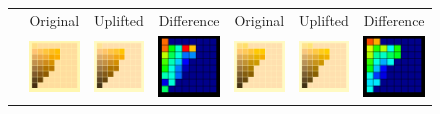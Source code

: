 \begin{figure}[t!]
	\centering
	{\sffamily
		\setlength\tabcolsep{0.5pt}
		\begin{tabular}{ccccccc}
			&Original& Uplifted & Difference &\quad Original & Uplifted & Difference
			\vspace{1em} \\ 
			\raisebox{0.4cm}[0pt][0pt]{\parbox[c][0pt][c]{0cm}{\hspace{-1.5em}\\[20pt]}\par}
			&\includegraphics[width=.155\linewidth]{img/results_uplift_page09_originalFL11.png}
			&
			\includegraphics[width=.155\linewidth]{img/results_uplift_page09_sigmoidFL11.png}
			& 
			\includegraphics[width=.155\linewidth]{img/results_uplift_page09_diff_sigmoidFL11.png}
			&\quad
			\includegraphics[width=.155\linewidth]{img/results_uplift_page10_originalFL11.png}
			&
			\includegraphics[width=.155\linewidth]{img/results_uplift_page10_sigmoidFL11.png}
			&
			\includegraphics[width=.155\linewidth]{img/results_uplift_page10_diff_sigmoidFL11.png}

\end{tabular}}
\end{figure}
